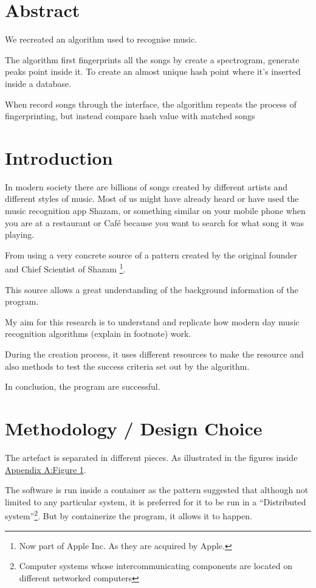 \chapter*{Abstract}
We recreated an algorithm used to recognise music. 

The algorithm first fingerprints all the songs by create a spectrogram, generate peaks point inside it. To create an almost unique hash point where it's inserted inside a database. 

When record songs through the interface, the algorithm repeats the process of fingerprinting, but instead compare hash value with matched songs
\chapter{Introduction}

In modern society there are billions of songs created by different artists and different styles of music. Most of us might have already heard or have used the music recognition app Shazam, or something similar on your mobile phone when you are at a restaurant or Café because you want to search for what song it was playing. 

From using a very concrete source of a pattern created by the original founder and Chief Scientist of Shazam \footnote{Now part of Apple Inc. As they are acquired by Apple.}\cite{noauthor_avery_nodate}.

This source allows a great understanding of the background information of the program. 

My aim for this research is to understand and replicate how modern day music recognition algorithms (explain in footnote) work. 

During the creation process, it uses different resources to make the resource and also methods to test the success criteria set out by the algorithm. 

In conclusion, the program are successful.
\chapter{Methodology / Design Choice}
The artefact is separated in different pieces. As illustrated in the figures inside \hyperref[fig:overall_arch]{Appendix A:Figure 1}. 

The software is run inside a container as the pattern suggested that although not limited to any particular system, it is preferred for it to be run in a “Distributed system”\footnote{Computer systems whose intercommunicating components are located on different networked computers\cite{noauthor_distributed_2024}}. But by containerize the program, it allows it to happen.

